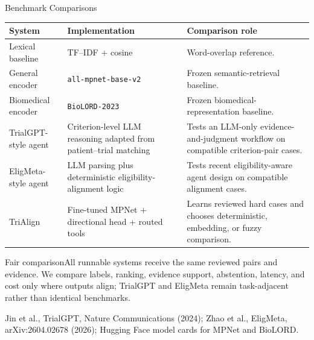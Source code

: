 \documentclass[aspectratio=169,10pt]{beamer}
\newcommand{\source}[1]{{\tiny\color{muted}#1}}
\begin{document}
\begin{frame}{Benchmark Comparisons}
\footnotesize
\begin{tabularx}{\textwidth}{@{}p{}p{}X@{}}\toprule System & Implementation & Comparison role \\\midrule
Lexical baseline & TF--IDF + cosine & Word-overlap reference. \\
General encoder & \texttt{all-mpnet-base-v2} & Frozen semantic-retrieval baseline. \\
Biomedical encoder & \texttt{BioLORD-2023} & Frozen biomedical-representation baseline. \\
TrialGPT-style agent & Criterion-level LLM reasoning adapted from patient--trial matching & Tests an LLM-only evidence-and-judgment workflow on compatible criterion-pair cases. \\
EligMeta-style agent & LLM parsing plus deterministic eligibility-alignment logic & Tests recent eligibility-aware agent design on compatible alignment cases. \\
TriAlign & Fine-tuned MPNet + directional head + routed tools & Learns reviewed hard cases and chooses deterministic, embedding, or fuzzy comparison. \\\bottomrule\end{tabularx}
\vspace{.4em}
\begin{block}{Fair comparison}All runnable systems receive the same reviewed pairs and evidence. We compare labels, ranking, evidence support, abstention, latency, and cost only where outputs align; TrialGPT and EligMeta remain task-adjacent rather than identical benchmarks.\end{block}
\source{Jin et al., TrialGPT, Nature Communications (2024); Zhao et al., EligMeta, arXiv:2604.02678 (2026); Hugging Face model cards for MPNet and BioLORD.}
\end{frame}
\end{document}

